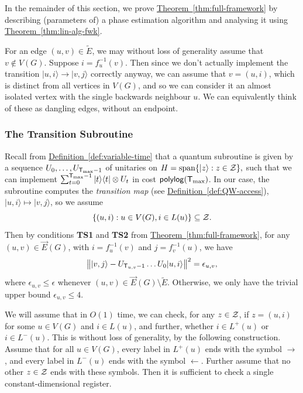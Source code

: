 \documentclass{theoretics}
\newcommand{\thm}[1]{\hyperref[thm:#1]{Theorem~\ref*{thm:#1}}}
\newcommand{\defin}[1]{\hyperref[def:#1]{Definition~\ref*{def:#1}}}
\def\ket#1{{\lvert}#1\rangle}
\def\bra#1{{\langle}#1\rvert}
\renewcommand{\>}{\rangle}
\newcommand{\<}{\langle}
\renewcommand{\(}{\left(}
\renewcommand{\)}{\right)}
\def\norm#1{\left\| #1 \right\|}
\begin{document}
In the remainder of this section, we prove \thm{full-framework} by describing (parameters of) a phase estimation algorithm and analysing it using \thm{lin-alg-fwk}. 

\begin{remark}\label{rem:orphan-vertices}
For an edge $(u,v)\in\tilde{E}$, we may without loss of generality assume that $v\not\in V(G)$. Suppose $i=f_u^{-1}(v)$. Then since we don't actually implement the transition $\ket{u,i}\rightarrow\ket{v,j}$ correctly anyway, we can assume that $v=(u,i)$, which is distinct from all vertices in $V(G)$, and so we can consider it an almost isolated vertex with the single backwards neighbour $u$. We can equivalently think of these as dangling edges, without an endpoint.
\end{remark}


\subsubsection{The Transition Subroutine}\label{sec:fwk-transitions}

Recall from \defin{variable-time} that a quantum subroutine is given by a sequence $U_0,\dots,U_{{\sf T}_{\max}-1}$ of unitaries on
$H=\mathrm{span}\{\ket{z}:z\in{\cal Z}\},$
such that we can implement $\sum_{t=0}^{{\sf T}_{\max}-1}\ket{t}\bra{t}\otimes U_t$ in cost ${\sf polylog}({\sf T}_{\max})$. 
In our case, the subroutine computes the \emph{transition map} (see \defin{QW-access}), $\ket{u,i}\mapsto \ket{v,j}$, so we assume 
$$\{(u,i): u\in V(G),i\in L(u)\}\subseteq{\cal Z}.$$
Then by conditions \textbf{TS1} and \textbf{TS2} from \thm{full-framework}, for any $(u,v)\in \overrightarrow{E}(G)$, with $i=f_u^{-1}(v)$ and $j=f_v^{-1}(u)$, we have  
\begin{equation}
\norm{\ket{v,j} - U_{{\sf T}_{u,v}-1}\dots U_0\ket{u,i}}^2 = \epsilon_{u,v},\label{eq:fwk-alg-error}
\end{equation}
where $\epsilon_{u,v}\leq \epsilon$ whenever $(u,v)\in\overrightarrow{E}(G)\setminus\tilde{E}$. Otherwise, we only have the trivial upper bound $\epsilon_{u,v}\leq 4$.  

We will assume that in $O(1)$ time, we can check, for any $z\in {\cal Z}$, if $z=(u,i)$ for some $u\in V(G)$ and $i\in L(u)$, and further, whether $i\in L^+(u)$ or $i\in L^-(u)$. This is without loss of generality, by the following construction. Assume that for all $u\in V(G)$, every label in $L^+(u)$ ends with the symbol $\rightarrow$, and every label in $L^-(u)$ ends with the symbol $\leftarrow$. Further assume that no other $z\in {\cal Z}$ ends with these symbols. Then it is sufficient to check a single constant-dimensional register.
\end{document}
